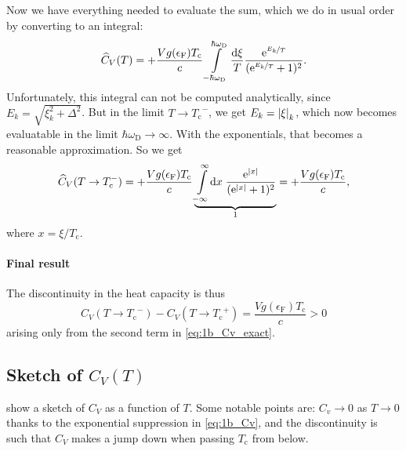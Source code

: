 \documentclass[11pt,letter, swedish, english
]{article}
\newcommand{\Tc}{\ensuremath{T_{\text{c}}}}
\newcommand{\eF}{\ensuremath{\epsilon_{\text{F}}}}
\newcommand{\wD}{\ensuremath{\omega_{\text{D}}}}
\begin{document}
Now we have everything needed to evaluate the sum, which we do in
usual order by converting to an integral:
\begin{equation}
\widehat{C}_V(T) = +\frac{Vg(\eF)\Tc}{c}
\int_{-\hbar\wD}^{\hbar\wD}\frac{\rd\xi}{T}
\frac{\ee^{\nicefrac{E_k}{T}}}{(\ee^{\nicefrac{E_k}{T}}+1)^2}.
\end{equation}
Unfortunately, this integral can not be computed analytically, since
$E_k=\sqrt{\xi_k^2+\Delta^2}$. But in the limit $T\to\Tc^-$, we get
$E_k=\abs{\xi}_k$, which now becomes evaluatable in the limit
$\hbar\wD\to\infty$. With the exponentials, that becomes a reasonable
approximation. So we get
\begin{equation}
\widehat{C}_V(T\to\Tc^-) = +\frac{Vg(\eF)\Tc}{c}
\underbrace{\int_{-\infty}^{\infty}\!\rd{x}\;
\frac{\ee^{|x|}}{(\ee^{|x|}+1)^2}}_{1}
= +\frac{Vg(\eF)\Tc}{c},\vspace{-8pt}
\end{equation}
where $x=\xi/\Tc$.

\paragraph{Final result}
The discontinuity in the heat capacity is thus
\begin{equation}
C_V(T\to\Tc^-)-C_V(T\to\Tc^+)=\frac{Vg(\eF)\Tc}{c}>0
\end{equation}
arising only from the second term in \eqref{eq:1b_Cv_exact}.

\subsection{Sketch of $C_V(T)$}
 show a sketch of $C_V$ as a function of $T$. Some
notable points are: $C_v\to0$ as $T\to0$ thanks to the exponential
suppression in \eqref{eq:1b_Cv}, and the discontinuity is such that
$C_V$ makes a jump down when passing $\Tc$ from below.


\begin{figure}
\centering
\resizebox{.7\textwidth}{!}{}
\caption{}
\label{fig:1_Cv}
\end{figure}
\end{document}
